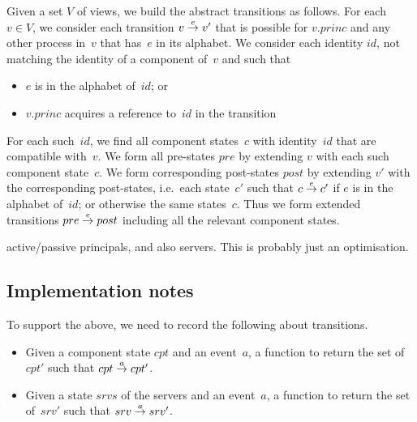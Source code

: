 \begin{definition}
Given a set $V$ of views, we build the abstract transitions as follows.  For
each $v \in V$, we consider each transition $v \stackrel{e}\rightarrow v'$ that is possible
for $v.princ$ and any other process in~$v$ that has~$e$ in its alphabet.  We
consider each identity $id$, not matching the identity of a component of~$v$
and such that
%
\begin{itemize}
\item $e$ is in the alphabet of~$id$; or

\item $v.princ$ acquires a reference to~$id$ in the transition
\end{itemize}
%
For each such~$id$, we find all component states~$c$ with identity~$id$ that
are compatible with~$v$.  We form all pre-states $pre$ by extending $v$ with
each such component state~$c$.  We form corresponding post-states $post$ by
extending $v'$ with the corresponding post-states, i.e.\ each state~$c'$ such
that $c \stackrel{e}\rightarrow c'$ if $e$ is in the alphabet of~$id$; or otherwise the same
states~$c$.  Thus we form extended transitions $pre \stackrel{e}\rightarrow post$ including
all the relevant component states.

\end{definition}







active/passive principals, and also servers.  This is probably just an
optimisation. 






\subsection{Implementation notes}

To support the above, we need to record the following about transitions.
%
\begin{itemize}
\item
Given a component state $cpt$ and an event~$a$, a function to return the set
of $cpt'$ such that $cpt \stackrel{a}\rightarrow cpt'$.

\item
Given a state $srvs$ of the servers and an event~$a$, a function to return the
set of~$srv'$ such that $srv \stackrel{a}\rightarrow srv'$.
\end{itemize}

